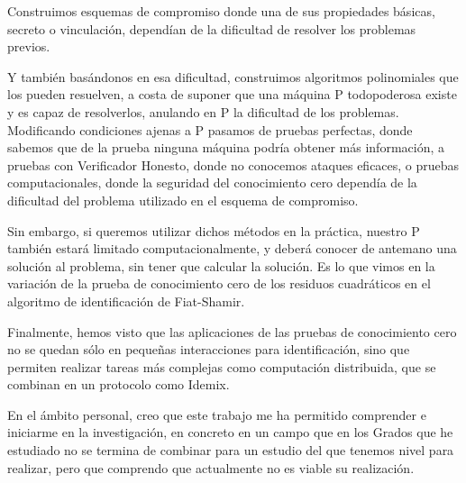 Construimos esquemas de compromiso donde una de sus propiedades básicas, secreto o vinculación, dependían de la dificultad de resolver los problemas previos.

Y también basándonos en esa dificultad, construimos algoritmos polinomiales que los pueden resuelven, a costa de suponer que una máquina P todopoderosa existe y es capaz de resolverlos, anulando en P la dificultad de los problemas. Modificando condiciones ajenas a P pasamos de pruebas perfectas, donde sabemos que de la prueba ninguna máquina podría obtener más información, a pruebas con Verificador Honesto, donde no conocemos ataques eficaces, o pruebas computacionales, donde la seguridad del conocimiento cero dependía de la dificultad del problema utilizado en el esquema de compromiso.

Sin embargo, si queremos utilizar dichos métodos en la práctica, nuestro P también estará limitado computacionalmente, y deberá conocer de antemano una solución al problema, sin tener que calcular la solución. Es lo que vimos en la variación de la prueba de conocimiento cero de los residuos cuadráticos en el algoritmo de identificación de Fiat-Shamir.

Finalmente, hemos visto que las aplicaciones de las pruebas de conocimiento cero no se quedan sólo en pequeñas interacciones para identificación, sino que permiten realizar tareas más complejas como computación distribuida, que se combinan en un protocolo como Idemix.


En el ámbito personal, creo que este trabajo me ha permitido comprender e iniciarme en la investigación, en concreto en un campo que en los Grados que he estudiado no se termina de combinar para un estudio del que tenemos nivel para realizar, pero que comprendo que actualmente no es viable su realización.


